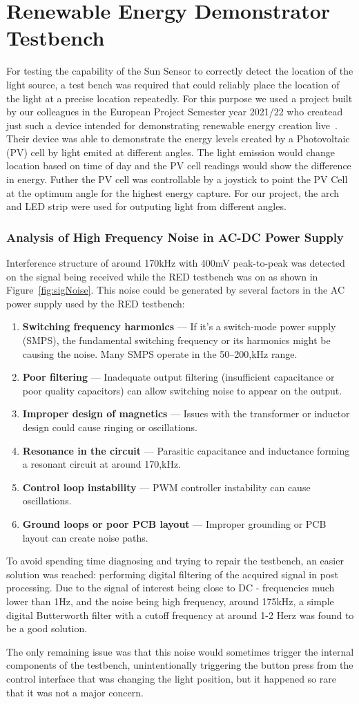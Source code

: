 \section{Renewable Energy Demonstrator Testbench}
For testing the capability of the Sun Sensor to correctly detect the location of the light source, a test bench was required that could reliably place the location of the light at a precise location repeatedly. For this purpose we used a project built by our colleagues in the European Project Semester year 2021/22 who createad just such a device intended for demonstrating renewable energy creation live~\cite{RefWorks:shopov2022renewable}. Their device was able to demonstrate the energy levels created by a Photovoltaic (PV) cell by light emited at different angles. The light emission would change location based on time of day and the PV cell readings would show the difference in energy. Futher the PV cell was controllable by a joystick to point the PV Cell at the optimum angle for the highest energy capture. For our project, the arch and LED strip were used for outputing light from different angles.
\subsubsection*{Analysis of High Frequency Noise in AC-DC Power Supply}
Interference structure of around 170kHz with 400mV peak-to-peak was detected on the signal being received while the RED testbench was on as shown in Figure~\ref{fig:sigNoise}. This noise could be generated by several factors in the AC power supply used by the RED testbench:
\begin{enumerate}[label=\arabic*.]
\item \textbf{Switching frequency harmonics} --- If it's a switch-mode power supply (SMPS), the fundamental switching frequency or its harmonics might be causing the noise. Many SMPS operate in the 50--200,kHz range.
\item \textbf{Poor filtering} --- Inadequate output filtering (insufficient capacitance or poor quality capacitors) can allow switching noise to appear on the output.
\item \textbf{Improper design of magnetics} --- Issues with the transformer or inductor design could cause ringing or oscillations.
\item \textbf{Resonance in the circuit} --- Parasitic capacitance and inductance forming a resonant circuit at around 170,kHz.
\item \textbf{Control loop instability} --- PWM controller instability can cause oscillations.
\item \textbf{Ground loops or poor PCB layout} --- Improper grounding or PCB layout can create noise paths.~\cite{RefWorks:giuliattini2006prediction}
\end{enumerate}
To avoid spending time diagnosing and trying to repair the testbench, an easier solution was reached: performing digital filtering of the acquired signal in post processing. Due to the signal of interest being close to DC - frequencies much lower than 1Hz, and the noise being high frequency, around 175kHz, a simple digital Butterworth filter with a cutoff frequency at around 1-2 Herz was found to be a good solution.

The only remaining issue was that this noise would sometimes trigger the internal components of the testbench, unintentionally triggering the button press from the control interface that was changing the light position, but it happened so rare that it was not a major concern.